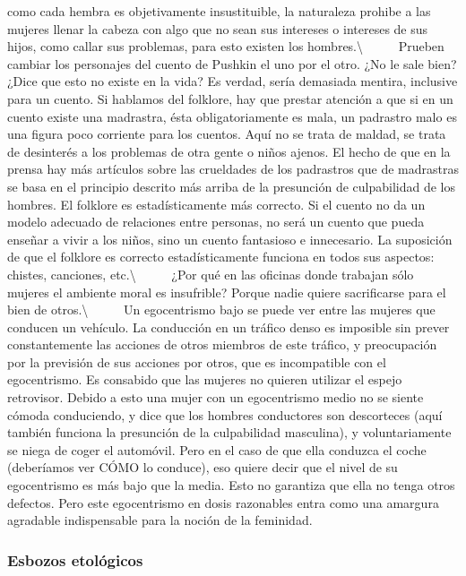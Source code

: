 como cada hembra es objetivamente insustituible, la naturaleza prohibe a
las mujeres llenar la cabeza con algo que no sean sus intereses o
intereses de sus hijos, como callar sus problemas, para esto existen los
hombres.\textbackslash{} ~ ~ ~ Prueben cambiar los personajes del cuento
de Pushkin el uno por el otro. ¿No le sale bien? ¿Dice que esto no
existe en la vida? Es verdad, sería demasiada mentira, inclusive para un
cuento. Si hablamos del folklore, hay que prestar atención a que si en
un cuento existe una madrastra, ésta obligatoriamente es mala, un
padrastro malo es una figura poco corriente para los cuentos. Aquí no se
trata de maldad, se trata de desinterés a los problemas de otra gente o
niños ajenos. El hecho de que en la prensa hay más artículos sobre las
crueldades de los padrastros que de madrastras se basa en el principio
descrito más arriba de la presunción de culpabilidad de los hombres. El
folklore es estadísticamente más correcto. Si el cuento no da un modelo
adecuado de relaciones entre personas, no será un cuento que pueda
enseñar a vivir a los niños, sino un cuento fantasioso e innecesario. La
suposición de que el folklore es correcto estadísticamente funciona en
todos sus aspectos: chistes, canciones, etc.\textbackslash{} ~ ~ ~ ¿Por
qué en las oficinas donde trabajan sólo mujeres el ambiente moral es
insufrible? Porque nadie quiere sacrificarse para el bien de
otros.\textbackslash{} ~ ~ ~ Un egocentrismo bajo se puede ver entre las
mujeres que conducen un vehículo. La conducción en un tráfico denso es
imposible sin prever constantemente las acciones de otros miembros de
este tráfico, y preocupación por la previsión de sus acciones por otros,
que es incompatible con el egocentrismo. Es consabido que las mujeres no
quieren utilizar el espejo retrovisor. Debido a esto una mujer con un
egocentrismo medio no se siente cómoda conduciendo, y dice que los
hombres conductores son descorteces (aquí también funciona la presunción
de la culpabilidad masculina), y voluntariamente se niega de coger el
automóvil. Pero en el caso de que ella conduzca el coche (deberíamos ver
CÓMO lo conduce), eso quiere decir que el nivel de su egocentrismo es
más bajo que la media. Esto no garantiza que ella no tenga otros
defectos. Pero este egocentrismo en dosis razonables entra como una
amargura agradable indispensable para la noción de la feminidad.

\protect\hypertarget{M23}{}{}

\subsubsection{Esbozos etológicos}\label{esbozos-etoluxf3gicos}

